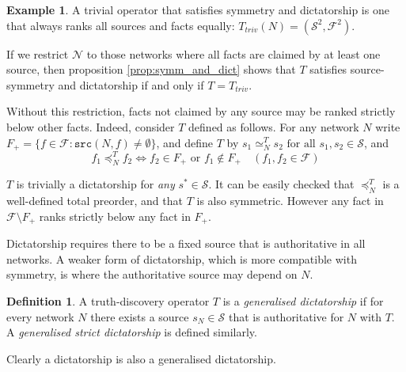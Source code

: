 \documentclass{article}
\theoremstyle{definition} \newtheorem{definition}{Definition}
\theoremstyle{definition} \newtheorem{example}{Example}
\theoremstyle{plain} \newtheorem{axiom}{Axiom}
\theoremstyle{plain} \newtheorem*{remark}{Remark}
\theoremstyle{remark} \newtheorem*{notation}{Notation}
\theoremstyle{plain} \newtheorem{lemma}{Lemma}
\theoremstyle{plain} \newtheorem{theorem}{Theorem}
\theoremstyle{plain} \newtheorem{proposition}{Proposition}
\renewcommand{\S}{\mathcal{S}}  %
\newcommand{\F}{\mathcal{F}}
\newcommand{\N}{\mathcal{N}}
\newcommand{\seq}{\simeq}
\newcommand{\fle}{\preceq}
\newcommand{\src}{\texttt{src}}
\begin{document}
\begin{example}
A trivial operator that satisfies symmetry and dictatorship is one that always
ranks all sources and facts equally: $T_{triv}(N) = (\S^2, \F^2)$.

If we restrict $\N$ to those networks where all facts are claimed by
at least one source, then proposition \ref{prop:symm_and_dict} shows that $T$
satisfies source-symmetry and dictatorship if and only if $T=T_{triv}$.

Without this restriction, facts not claimed by any source may be ranked
strictly below other facts. Indeed, consider $T$ defined as follows. For any
network $N$ write $F_{+} = \{f \in \F : \src(N, f) \ne \emptyset \}$, and
define $T$ by $s_1 \seq_N^{T} s_2 \text{ for all } s_1, s_2 \in \S$, and
$$
    f_1 \fle_N^{T} f_2 \iff f_2 \in F_{+} \text{ or } f_1 \notin F_{+}
    \quad
    (f_1, f_2 \in \F)
$$

$T$ is trivially a dictatorship for \emph{any} $s^* \in \S$. It can be easily
checked that $\fle_N^T$ is a well-defined total preorder, and that $T$ is also
symmetric. However any fact in $\F \setminus F_+$ ranks strictly below any fact
in $F_+$.
\end{example}

Dictatorship requires there to be a fixed source that is authoritative
in all networks. A weaker form of dictatorship, which is more compatible with
symmetry, is where the authoritative source may depend on $N$.

\begin{definition}
\label{def:gen_dict}
A truth-discovery operator $T$ is a \emph{generalised dictatorship} if for
every network $N$ there exists a source $s_N \in \S$ that is authoritative for
$N$ with $T$. A \emph{generalised strict dictatorship} is defined similarly.
\end{definition}

Clearly a dictatorship is also a generalised dictatorship.
\end{document}

